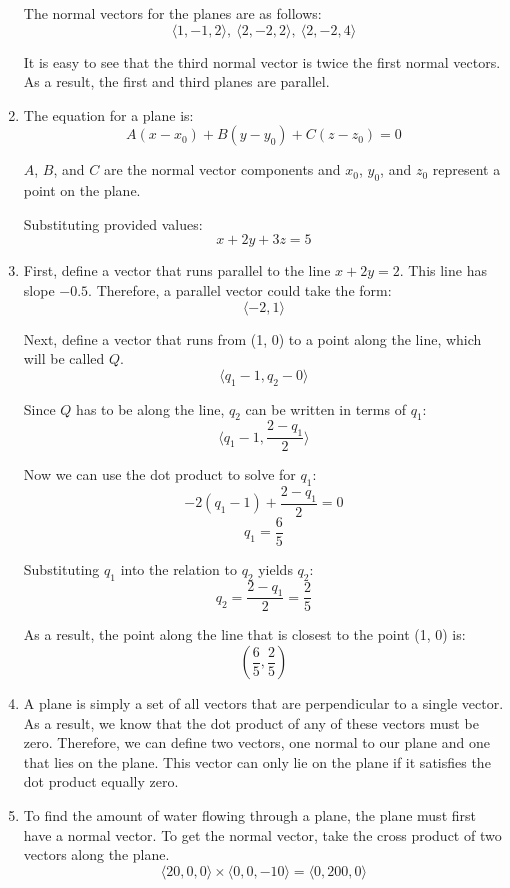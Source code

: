 \documentclass{article}
\begin{document}
\begin{enumerate}[1.]
    The normal vectors for the planes are as follows:
    $$ \langle 1, -1, 2 \rangle,\ \langle 2, -2, 2 \rangle,\ \langle 2, -2, 4
    \rangle $$

    It is easy to see that the third normal vector is twice the first normal
    vectors. As a result, the first and third planes are parallel.

  \item The equation for a plane is:
    $$ A(x - x_{0}) + B(y - y_{0}) + C(z - z_{0}) = 0 $$

    $A$, $B$, and $C$ are the normal vector components and $x_{0}$, $y_{0}$, and
    $z_{0}$ represent a point on the plane.

    \bigbreak

    Substituting provided values:
    $$ x + 2y + 3z = 5 $$

  \item First, define a vector that runs parallel to the line $x + 2y = 2$. This
    line has slope $-0.5$. Therefore, a parallel vector could take the form:
    $$ \langle -2, 1 \rangle $$

    Next, define a vector that runs from (1, 0) to a point along the line, which
    will be called $Q$.
    $$ \langle q_{1} - 1, q_{2} - 0 \rangle $$

    Since $Q$ has to be along the line, $q_{2}$ can be written in terms of
    $q_{1}$:
    $$ \Big \langle q_{1} - 1, \frac{ 2 - q_{1} }{ 2 } \Big \rangle $$

    Now we can use the dot product to solve for $q_{1}$:
    $$ -2 (q_{1} - 1) + \frac{ 2 - q_{1} }{ 2 } = 0$$
    $$ q_{1} = \frac{ 6 }{ 5 } $$

    Substituting $q_{1}$ into the relation to $q_{2}$ yields $q_{2}$:
    $$ q_{2} = \frac{ 2 - q_{1} }{ 2 } = \frac{ 2 }{ 5 } $$

    As a result, the point along the line that is closest to the point (1, 0)
    is:
    $$ \left( \frac{ 6 }{ 5 }, \frac{ 2 }{ 5 } \right) $$

  \item A plane is simply a set of all vectors that are perpendicular to a
    single vector. As a result, we know that the dot product of any of these
    vectors must be zero. Therefore, we can define two vectors, one normal to
    our plane and one that lies on the plane. This vector can only lie on the
    plane if it satisfies the dot product equally zero.

  \item To find the amount of water flowing through a plane, the plane must
    first have a normal vector. To get the normal vector, take the cross product
    of two vectors along the plane.
    $$ \langle 20, 0, 0 \rangle \times \langle 0, 0, -10 \rangle = \langle 0,
    200, 0 \rangle$$


\end{enumerate}
\end{document}
